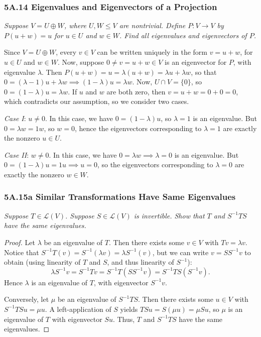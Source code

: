 \documentclass{article}
\begin{document}
\subsubsection*{5A.14 Eigenvalues and Eigenvectors of a Projection}
\textit{Suppose $V = U\oplus W$, where $U,W\leq V$ are nontrivial. Define $P: V\to V$ by $P(u + w) = u$ for $u\in U$ and $w\in W$. Find all eigenvalues and eigenvectors of $P$.}
\begin{solution}
Since $V = U\oplus W$, every $v\in V$ can be written uniquely in the form $v = u+w$, for $u\in U$ and $w\in W$. Now, suppose $0\neq v = u+w\in V$ is an eigenvector for $P$, with eigenvalue $\lambda$. Then $P(u+w) = u = \lambda(u+w) = \lambda u+\lambda w$, so that $0 = (\lambda - 1)u + \lambda w \implies (1-\lambda)u = \lambda w$. Now, $U\cap V = \{0\}$, so $0 = (1-\lambda)u = \lambda w$. If $u$ and $w$ are both zero, then $v = u+w = 0+0 = 0$, which contradicts our assumption, so we consider two cases.

\textit{Case I}: $u\neq 0$. In this case, we have $0 = (1-\lambda)u$, so $\boxed{\lambda = 1}$ is an eigenvalue. But $0 = \lambda w = 1w$, so $w=0$, hence the eigenvectors corresponding to $\lambda = 1$ are exactly the nonzero $u\in U$.

\textit{Case II}: $w\neq 0$. In this case, we have $0 = \lambda w \implies \boxed{\lambda = 0}$ is an eigenvalue. But $0 = (1-\lambda)u = 1u \implies u=0$, so the eigenvectors corresponding to $\lambda = 0$ are exactly the nonzero $w\in W$.
\end{solution}
\subsubsection*{5A.15a Similar Transformations Have Same Eigenvalues}
\textit{Suppose $T\in \mathcal L(V)$. Suppose $S\in \mathcal L(V)$ is invertible. Show that $T$ and $S^{-1}TS$ have the same eigenvalues.}
\begin{proof}
Let $\lambda$ be an eigenvalue of $T$. Then there exists some $v\in V$ with $Tv = \lambda v$. Notice that $S^{-1}T(v) = S^{-1}(\lambda v) = \lambda S^{-1}(v)$, but we can write $v = SS^{-1}v$ to obtain (using linearity of $T$ and $S$, and thus linearity of $S^{-1}$):
$$\lambda S^{-1}v = S^{-1}Tv = S^{-1}T(SS^{-1}v) = S^{-1}TS(S^{-1}v).$$
Hence $\lambda$ is an eigenvalue of $T$, with eigenvector $S^{-1}v$.

Conversely, let $\mu$ be an eigenvalue of $S^{-1}TS$. Then there exists some $u\in V$ with $S^{-1}TSu = \mu u$. A left-application of $S$ yields $TSu = S(\mu u) = \mu Su$, so $\mu$ is an eigenvalue of $T$ with eigenvector $Su$. Thus, $T$ and $S^{-1}TS$ have the same eigenvalues.
\end{proof}
\end{document}
